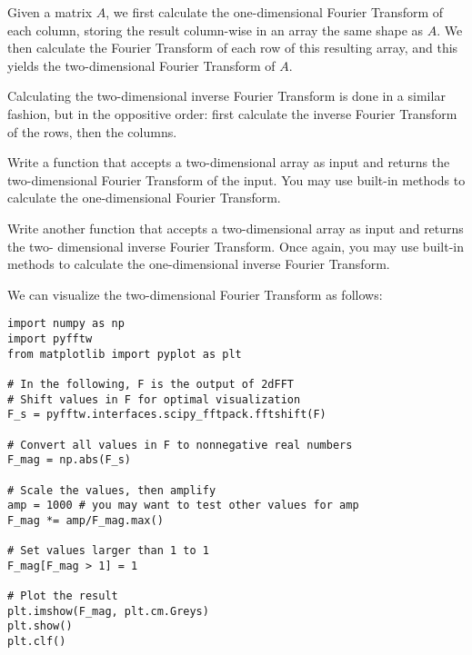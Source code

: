 Given a matrix $A$, we first calculate the one-dimensional Fourier Transform of each column, storing the
result column-wise in an array the same shape as $A$. We then calculate the Fourier Transform of each 
row of this resulting array, and this yields the two-dimensional Fourier Transform of $A$. 

Calculating the two-dimensional inverse Fourier Transform is done in a similar fashion, but in the
oppositive order: first calculate the inverse Fourier Transform of the rows, then the columns.

\begin{problem}
Write a function  that accepts a two-dimensional array as input and returns the two-dimensional
Fourier Transform of the input. You may use built-in methods to calculate the one-dimensional Fourier
Transform.

Write another function  that accepts a two-dimensional array as input and returns the two-
dimensional inverse Fourier Transform. Once again,  you may use built-in methods to calculate the 
one-dimensional inverse Fourier Transform.
\end{problem}

We can visualize the two-dimensional Fourier Transform as follows:
\begin{lstlisting}
import numpy as np
import pyfftw
from matplotlib import pyplot as plt

# In the following, F is the output of 2dFFT
# Shift values in F for optimal visualization
F_s = pyfftw.interfaces.scipy_fftpack.fftshift(F)

# Convert all values in F to nonnegative real numbers
F_mag = np.abs(F_s)

# Scale the values, then amplify
amp = 1000 # you may want to test other values for amp
F_mag *= amp/F_mag.max()

# Set values larger than 1 to 1
F_mag[F_mag > 1] = 1

# Plot the result
plt.imshow(F_mag, plt.cm.Greys)
plt.show()
plt.clf()
\end{lstlisting}



